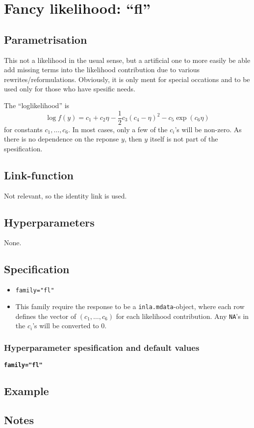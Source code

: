 \documentclass[a4paper,11pt]{article}
\begin{document}
\section*{Fancy likelihood: ``fl''}

\subsection*{Parametrisation}

This not a likelihood in the usual sense, but a artificial one to more
easily be able add missing terms into the likelihood contribution due
to various rewrites/reformulations. Obviously, it is only ment for
special occations and to be used only for those who have spesific
needs.

The ``loglikelihood'' is
\begin{displaymath}
    \log f(y) = c_1 + c_2 \eta -\frac{1}{2} c_3 (c_4 - \eta)^{2} - c_5 \exp(c_6 \eta)
\end{displaymath}
for constants $c_1, \ldots, c_6$. In most cases, only a few of the
$c_i$'s will be non-zero. As there is no dependence on the reponse
$y$, then $y$ itself is not part of the spesification.

\subsection*{Link-function}

Not relevant, so the identity link is used.

\subsection*{Hyperparameters}

None.

\subsection*{Specification}

\begin{itemize}
\item \texttt{family="fl"}
\item This family require the response to be a
    \texttt{inla.mdata}-object, where each row defines the vector of
    $(c_1, \ldots, c_6)$ for each likelihood contribution. Any
    \texttt{NA}'s in the $c_i$'s will be converted to 0.
\end{itemize}

\subsubsection*{Hyperparameter spesification and default values}
\textbf{\texttt{family="fl"}}

\subsection*{Example}



\subsection*{Notes}
\end{document}
